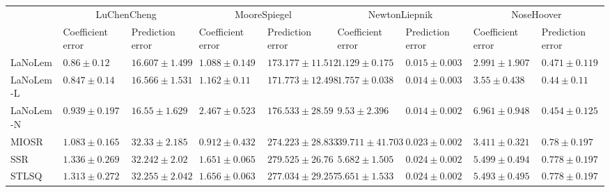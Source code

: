 \begin{table*}
{\begin{tabular}{lllllllll}
 & \multicolumn{2}{c}{LuChenCheng} & \multicolumn{2}{c}{MooreSpiegel} & \multicolumn{2}{c}{NewtonLiepnik} & \multicolumn{2}{c}{NoseHoover} \\
 & Coefficient error & Prediction error & Coefficient error & Prediction error & Coefficient error & Prediction error & Coefficient error & Prediction error \\
\midrule
LaNoLem & $0.86\pm 0.12$ & $16.607\pm 1.499$ & $1.088\pm 0.149$ & $173.177\pm 11.512$ & $\mathbf{1.129}\pm 0.175$ & $0.015\pm 0.003$ & $\mathbf{2.991}\pm 1.907$ & $0.471\pm 0.119$ \\
LaNoLem-L & $\mathbf{0.847}\pm 0.14$ & $16.566\pm 1.531$ & $1.162\pm 0.11$ & $\mathbf{171.773}\pm 12.498$ & $1.757\pm 0.038$ & $0.014\pm 0.003$ & $3.55\pm 0.438$ & $\mathbf{0.44}\pm 0.11$ \\
LaNoLem-N & $0.939\pm 0.197$ & $\mathbf{16.55}\pm 1.629$ & $2.467\pm 0.523$ & $176.533\pm 28.59$ & $9.53\pm 2.396$ & $\mathbf{0.014}\pm 0.002$ & $6.961\pm 0.948$ & $0.454\pm 0.125$ \\
MIOSR & $1.083\pm 0.165$ & $32.33\pm 2.185$ & $\mathbf{0.912}\pm 0.432$ & $274.223\pm 28.833$ & $39.711\pm 41.703$ & $0.023\pm 0.002$ & $3.411\pm 0.321$ & $0.78\pm 0.197$ \\
SSR & $1.336\pm 0.269$ & $32.242\pm 2.02$ & $1.651\pm 0.065$ & $279.525\pm 26.76$ & $5.682\pm 1.505$ & $0.024\pm 0.002$ & $5.499\pm 0.494$ & $0.778\pm 0.197$ \\
STLSQ & $1.313\pm 0.272$ & $32.255\pm 2.042$ & $1.656\pm 0.063$ & $277.034\pm 29.257$ & $5.651\pm 1.533$ & $0.024\pm 0.002$ & $5.493\pm 0.495$ & $0.778\pm 0.197$ \\

\bottomrule
\end{tabular}
}
\end{table*}
